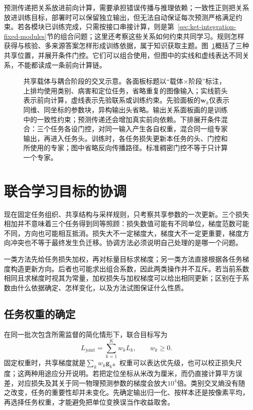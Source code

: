 预测传递把关系放进前向计算，需要承担错误传播与推理依赖；一致性正则把关系放进训练目标，部署时可以保留独立输出，但无法自动保证每次预测严格满足约束。若各模块已训练完成，只需按接口串接计算，则是第~\ref{sec:ket-integration-fixed-modules}节的组合问题；这里还考察这些关系如何约束共同学习。规则怎样获得与核验、多来源答案怎样形成训练依据，属于知识获取主题。图~\ref{fig:ket-sharing-locations}概括了三种共享位置，并展开条件门控。它们可以组合使用，但图中的实线和虚线表达不同关系，不能都读成一条前向计算链。

\begin{figure}[htbp]
  \centering
  
  \caption{共享载体与耦合阶段的交叉示意。各面板标题以“载体×阶段”标注，上排均使用类别、病害和定位任务，省略重复的图像输入；实线箭头表示前向计算，虚线表示先验联系或训练约束。先验面板的$\bm w_k$仅表示同维、同坐标的参数块，异构输出头省略。输出关系面板画的是训练中的一致性约束；预测传递还会增加真实前向依赖。下排展开条件混合：三个任务各设门控，对同一输入产生各自权重，混合同一组专家输出，再进入任务头。训练时，各任务损失更新本任务的头、门控和所使用的专家；图中省略反向传播路径。标准稠密门控不等于只计算一个专家。}
  \label{fig:ket-sharing-locations}
\end{figure}
\FloatBarrier

\section{联合学习目标的协调}
\label{sec:ket-sharing-objectives}

现在固定任务组织、共享结构与采样规则，只考察共享参数的一次更新。三个损失相加并不意味着三个任务得到同等照顾：损失数值可能有不同单位，梯度范数可能不同，方向也可能相互抵消。损失大不一定梯度大，梯度大不一定更重要，梯度方向冲突也不等于最终发生负迁移。协调方法必须说明自己处理的是哪一个问题。

一类方法先给任务损失加权，再对标量目标求梯度；另一类方法直接根据各任务梯度构造更新方向。后者也可能求出组合系数，因此两类操作并不互斥。若当前系数相同且求梯度时视其为常量，加权损失与加权梯度可以给出相同更新；区别在于系数由什么依据确定、怎样变化，以及方法试图保证什么性质。

\subsection{任务权重的确定}
\label{sec:ket-sharing-weights}

在同一批次包含所需监督的简化情形下，联合目标写为
\begin{equation}
  L_{\mathrm{joint}}
  =\sum_{k=1}^{K}w_kL_k,
  \qquad w_k\geq0.
  \label{eq:ket-sharing-weighted-loss}
\end{equation}
固定权重时，共享梯度就是$\sum_k w_k\bm g_k$。权重可以表达优先级，也可以校正损失尺度；这两种用途应分开说明。若把定位坐标从米改为厘米，而仍直接计算平方误差，对应损失及其关于同一物理预测参数的梯度会放大$10^4$倍。类别交叉熵没有随之改变，任务的重要性却并未变化。先确定输出归一化、按样本还是按像素平均，再选择任务权重，才能避免把单位变换误当作收益取舍。

